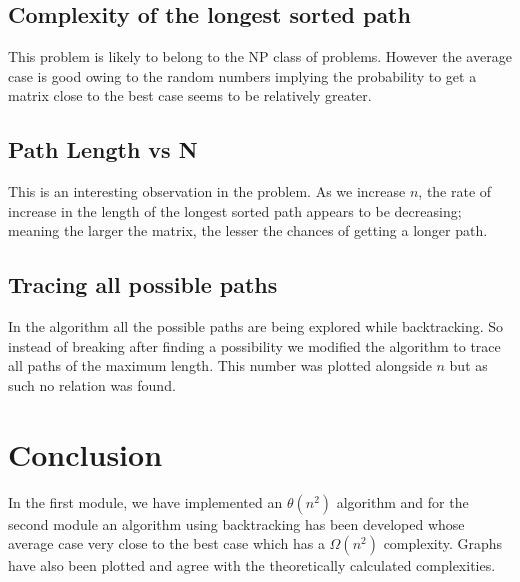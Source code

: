 \documentclass[letterpaper, 11 pt, conference]{ieeeconf}  %
\begin{document}
\subsection{Complexity of the longest sorted path}
This problem is likely to belong to the NP class of problems. However the average case is good owing to the random numbers implying the probability to get a matrix close to the best case seems to be relatively greater.

\subsection{Path Length vs N}
This is an interesting observation in the problem. As we increase $n$, the rate of increase in the length of the longest sorted path appears to be decreasing; meaning the larger the matrix, the lesser the chances of getting a longer path.

\subsection{Tracing all possible paths}
In the algorithm all the possible paths are being explored while backtracking. So instead of breaking after finding a possibility we modified the algorithm to trace all paths of the maximum length. This number was plotted alongside $n$ but as such no relation was found.

\section{Conclusion}
In the first module, we have implemented an $\theta(n^2)$ algorithm and for the second module an algorithm using backtracking has been developed whose average case very close to the best case which has a $\Omega(n^2)$ complexity. Graphs have also been plotted and agree with the theoretically calculated complexities.
\end{document}
